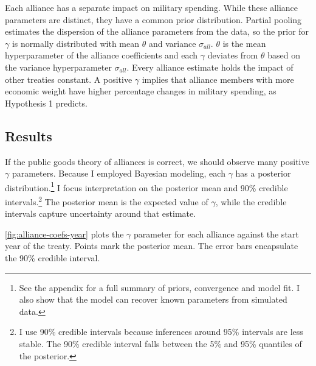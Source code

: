 \documentclass[12pt]{article}
\begin{document}
Each alliance has a separate impact on military spending.
While these alliance parameters are distinct, they have a common prior distribution.
Partial pooling estimates the dispersion of the alliance parameters from the data, so the prior for $\gamma$ is normally distributed with mean $\theta$ and variance $\sigma_{all}$. 
$\theta$ is the mean hyperparameter of the alliance coefficients and each $\gamma$ deviates from $\theta$ based on the variance hyperparameter $\sigma_{all}$.
Every alliance estimate holds the impact of other treaties constant. 
A positive $\gamma$ implies that alliance members with more economic weight have higher percentage changes in military spending, as Hypothesis 1 predicts. 
    


\subsection{Results} 


If the public goods theory of alliances is correct, we should observe many positive $\gamma$ parameters. 
Because I employed Bayesian modeling, each $\gamma$ has a posterior distribution.\footnote{See the appendix for a full summary of priors, convergence and model fit. I also show that the model can recover known parameters from simulated data.} 
I focus interpretation on the posterior mean and 90\% credible intervals.\footnote{I use 90\% credible intervals because inferences around 95\% intervals are less stable. The 90\% credible interval falls between the 5\% and 95\% quantiles of the posterior.}
The posterior mean is the expected value of $\gamma$, while the credible intervals capture uncertainty around that estimate.  


\autoref{fig:alliance-coefs-year} plots the $\gamma$ parameter for each alliance against the start year of the treaty.
Points mark the posterior mean. 
The error bars encapsulate the 90\% credible interval.
\end{document}
